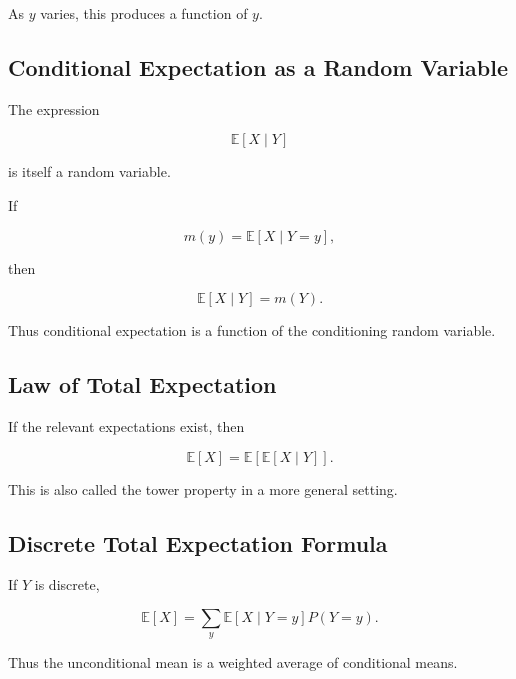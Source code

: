 As \(y\) varies, this produces a function of \(y\).

\subsection{Conditional Expectation as a Random Variable}
\label{subsec:conditional-expectation-rv}

The expression

\[
\boxed{
\mathbb{E}[X\mid Y]
}
\]

is itself a random variable.

If

\[
m(y)
=
\mathbb{E}[X\mid Y=y],
\]

then

\[
\boxed{
\mathbb{E}[X\mid Y]
=
m(Y).
}
\]

Thus conditional expectation is a function of the conditioning random
variable.

\subsection{Law of Total Expectation}
\label{subsec:law-total-expectation}

\begin{theorem}
If the relevant expectations exist, then

\[
\boxed{
\mathbb{E}[X]
=
\mathbb{E}
\left[
\mathbb{E}[X\mid Y]
\right].
}
\]
\end{theorem}

This is also called the tower property in a more general setting.

\subsection{Discrete Total Expectation Formula}
\label{subsec:discrete-total-expectation}

If \(Y\) is discrete,

\[
\boxed{
\mathbb{E}[X]
=
\sum_y
\mathbb{E}[X\mid Y=y]
P(Y=y).
}
\]

Thus the unconditional mean is a weighted average of conditional means.


